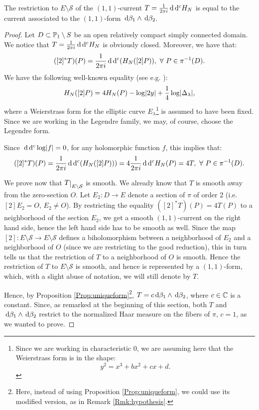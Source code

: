 \documentclass[a4paper,12pt]{article}
\theoremstyle{remark}
\begin{document}
\begin{corollary}\label{Cor:dynamicalforT}
	The restriction to $E \setminus \mathcal{S}$ of the $(1,1)$-current $T=\frac{1}{2\pi i}\de \de^c {H_N}$ is equal to the current associated to the $(1,1)$-form $\de \beta_1 \wedge \de \beta_2$.
\end{corollary}
\begin{proof}
	Let $D \subset \P_1\setminus S$ be an open relatively compact simply connected domain. We notice that $T=\frac{1}{2\pi i}\de \de^c {H_N}$ is obviously closed. Moreover, we have that:
	\[
	([2]^*T)(P)=\frac{1}{2\pi i}\de \de^c (H_N([2]P)), \ \forall\  P \in \pi^{-1}(D).
	\]
	We have the following well-known equality (see e.g. \cite[Theorem VI.1.1]{silverman1994advanced}):
	\[
	H_N([2]P)=4H_N(P)-\log \abs{2y}+\frac{1}{4}\log \abs{\Delta_\lambda},
	\]
	where a Weierstrass form for the elliptic curve $E_\lambda$\footnote{Since we are working in characteristic $0$, we are assuming here that the Weierstrass form is in the shape:
	\[
	y^2=x^3+bx^2+cx+d.
	\]} is assumed to have been fixed. Since we are working in the Legendre family, we may, of course, choose the Legendre form.
	
	Since $\de \de^c \log \abs{f}=0$, for any holomorphic function $f$, this implies that:
	\[
	([2]^*T)(P)=\frac{1}{2\pi i}\de \de^c (H_N([2]P)))=4\frac{1}{2\pi i}\de \de^c H_N(P)=4T, \ \forall\  P \in \pi^{-1}(D).
	\]
	
	We prove now that $\restricts{T}{E\setminus \mathcal{S}}$ is smooth. We already know that $T$ is smooth away from the zero-section $O$. Let $E_2:D \rightarrow E$ denote a section of $\pi$ of order $2$ (i.e. $[2]E_2=O$, $E_2 \neq O$). By restricting the equality $([2]^*T)(P)=4T(P)$ to a neighborhood of the section $E_2$, we get a smooth $(1,1)$-current on the right hand side, hence the left hand side has to be smooth as well. Since the map $[2]:E\setminus \mathcal{S}  \rightarrow E\setminus \mathcal{S}$ defines a biholomorphism between a neighborhood of $E_2$ and a neighborhood of $O$ (since we are restricting to the good reduction), this in turn tells us that the restriction of $T$ to a neighborhood of $O$ is smooth. Hence the restriction of $T$ to $E \setminus \mathcal{S}$ is smooth, and hence is represented by a $(1,1)$-form, which, with a slight abuse of notation, we will still denote by $T$.
	
	Hence, by Proposition \ref{Prop:uniqueform}\footnote{Here, instead of using Proposition \ref{Prop:uniqueform}, we could use its modified version, as in Remark \ref{Rmk:hypothesis}.}, $T=c \de \beta_1 \wedge \de \beta_2$, where $c \in \C$ is a constant. Since, as remarked at the beginning of this section, both $T$ and $\de \beta_1 \wedge \de \beta_2$ restrict to the normalized Haar measure on the fibers of $\pi$, $c=1$, as we wanted to prove.
\end{proof}





\end{document}
